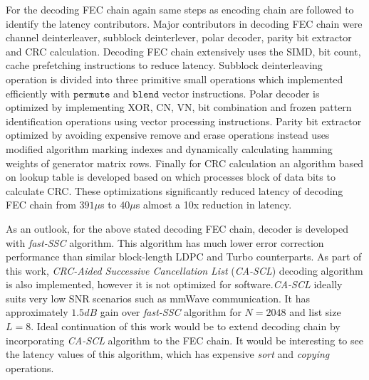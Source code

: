 For the decoding FEC chain again same steps as encoding chain are followed to identify the latency contributors. Major contributors in decoding FEC chain were channel deinterleaver, subblock deinterlever, polar decoder, parity bit extractor and CRC calculation. Decoding FEC chain extensively uses the SIMD, bit count, cache prefetching instructions to reduce latency. Subblock deinterleaving operation is divided into  three primitive small operations which implemented efficiently with $\mathtt{permute}$ and $\mathtt{blend}$ vector instructions. Polar decoder is optimized by implementing XOR, CN, VN, bit combination and frozen pattern identification operations using vector processing instructions. Parity bit extractor optimized by avoiding expensive remove and erase operations instead uses modified algorithm marking indexes and dynamically calculating hamming weights of generator matrix rows. Finally for CRC calculation an algorithm based on lookup table is developed based on \cite{Sarwate:1988:CCR:63030.63037} which processes block of data bits to calculate CRC. These optimizations significantly reduced latency of decoding FEC chain from $391 \mu$s to $40\mu$s almost a 10x reduction in latency. \newline

As an outlook, for the above stated decoding FEC chain, decoder is developed with \emph{fast-SSC} algorithm. This algorithm has much lower error correction performance than similar block-length LDPC and Turbo counterparts. As part of this work, \emph{CRC-Aided Successive Cancellation List} (\emph{CA-SCL})\cite{SCL} decoding algorithm is also implemented, however it is not optimized for software.\emph{CA-SCL} ideally suits very low SNR scenarios such as mmWave communication. It has approximately $1.5dB$ gain over \emph{fast-SSC} algorithm for $N=2048$ and list size $L = 8$. Ideal continuation of this work would be to extend decoding chain by incorporating \emph{CA-SCL} algorithm to the FEC chain. It would be interesting to see the latency values of this algorithm, which has expensive \emph{sort} and \emph{copying} operations.